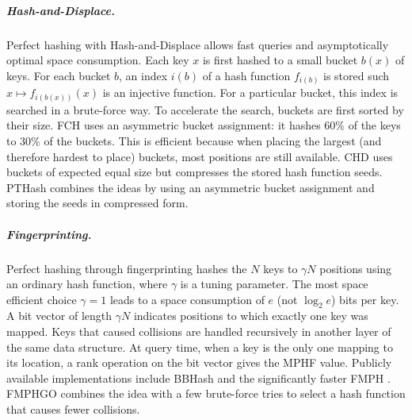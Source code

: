 \documentclass[a4paper,USenglish,cleveref]{lipics-v2021}
\newcommand{\myparagraph}[1]{\subparagraph*{#1}}
\begin{document}
\myparagraph{Hash-and-Displace.}
Perfect hashing with Hash-and-Displace \cite{fox1992faster,belazzougui2009hash,pibiri2021pthash} allows fast queries and asymptotically optimal space consumption.
Each key $x$ is first hashed to a small bucket $b(x)$ of keys.
For each bucket $b$, an index $i(b)$
of a hash function $f_{i(b)}$ is stored such $x \mapsto f_{i(b(x))}(x)$ is an injective function.
For a particular bucket, this index is searched in a brute-force way.
To accelerate the search, buckets are first sorted by their size.
FCH \cite{fox1992faster} uses an asymmetric bucket assignment: it hashes 60\% of the keys to 30\% of the buckets.
This is efficient because when placing the largest (and therefore hardest to place) buckets, most positions are still available.
CHD \cite{belazzougui2009hash} uses buckets of expected equal size but compresses the stored hash function seeds.
PTHash \cite{pibiri2021pthash} combines the ideas by using an asymmetric bucket assignment and storing the seeds in compressed form.

\myparagraph{Fingerprinting.}
Perfect hashing through fingerprinting \cite{chapman2011meraculous,MSSZ14} hashes the $N$ keys to $\gamma N$ positions using an ordinary hash function, where $\gamma$ is a tuning parameter.
The most space efficient choice $\gamma=1$ leads to a space consumption of $e$ (not $\log_2 e$) bits per key.
A bit vector of length $\gamma N$ indicates positions to which exactly one key was mapped.
Keys that caused collisions are handled recursively in another layer of the same data structure.
At query time, when a key is the only one mapping to its location, a rank operation on the bit vector gives the MPHF value.
Publicly available implementations include BBHash \cite{limasset2017fast} and the significantly faster FMPH \cite{beling2023fingerprinting}.
\mbox{FMPHGO} \cite{beling2023fingerprinting} combines the idea with a few brute-force tries to select a hash function that causes fewer collisions.
\end{document}
